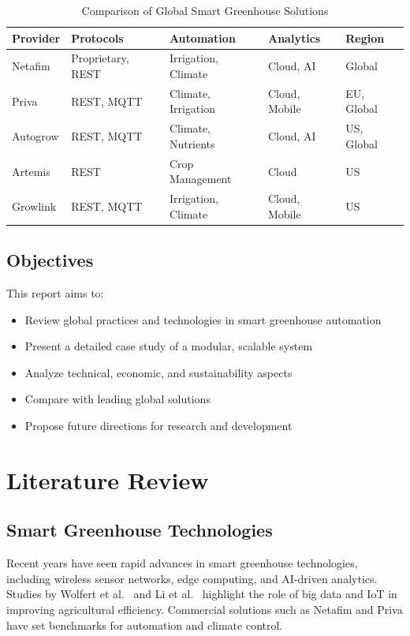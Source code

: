 \documentclass[12pt,a4paper]{article}
\begin{document}
\begin{table}[H]
    \centering
    \caption{Comparison of Global Smart Greenhouse Solutions}
    \begin{tabular}{@{}lllll@{}}
    \toprule
    Provider & Protocols & Automation & Analytics & Region \\
    \midrule
    Netafim & Proprietary, REST & Irrigation, Climate & Cloud, AI & Global \\
    Priva & REST, MQTT & Climate, Irrigation & Cloud, Mobile & EU, Global \\
    Autogrow & REST, MQTT & Climate, Nutrients & Cloud, AI & US, Global \\
    Artemis & REST & Crop Management & Cloud & US \\
    Growlink & REST, MQTT & Irrigation, Climate & Cloud, Mobile & US \\
    \bottomrule
    \end{tabular}\label{tab:global}
\end{table}

\subsection{Objectives}
This report aims to:
\begin{itemize}
    \item Review global practices and technologies in smart greenhouse automation
    \item Present a detailed case study of a modular, scalable system
    \item Analyze technical, economic, and sustainability aspects
    \item Compare with leading global solutions
    \item Propose future directions for research and development
\end{itemize}

\section{Literature Review}
\subsection{Smart Greenhouse Technologies}
Recent years have seen rapid advances in smart greenhouse technologies, including wireless sensor networks, edge computing, and AI-driven analytics. Studies by Wolfert et al.~\cite{SmartAgReview} and Li et al.~\cite{IoTGreenhouse2022} highlight the role of big data and IoT in improving agricultural efficiency. Commercial solutions such as Netafim and Priva have set benchmarks for automation and climate control.
\end{document}
